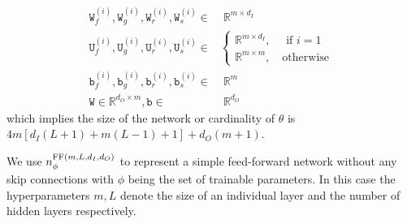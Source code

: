 \begin{align}
   \mathtt W_f^{(i)}, 
   \mathtt W_g^{(i)},  \mathtt W_r^{(i)},  \mathtt W_s^{(i)} \in&\;
   \mathbb R^{m\times d_I}\\
   \mathtt U_f^{(i)},
\mathtt U_g^{(i)},
\mathtt U_r^{(i)},
\mathtt U_s^{(i)}\in&
   \begin{cases}\mathbb R^{m\times d_I},\quad\text{ if }i=1 \\
   \mathbb R^{m\times m},\quad\text{otherwise}
   \end{cases}\\
   \mathtt b_f^{(i)},\mathtt b_g^{(i)},\mathtt b_r^{(i)},\mathtt b_s^{(i)}\in&\;\mathbb R^m\\
   \mathtt W\in\mathbb R^{d_O\times m}, \mathtt b\in&\;\mathbb R^{d_O}
\end{align}
which implies the size of the network or cardinality of $\theta$ is $4m[d_I(L+1)+m(L-1)+1]+d_O(m+1)$.

We use $n^{{\rm FF}(m, L, d_I, d_O)}_\phi$ to represent a simple feed-forward network without any skip connections with $\phi$ being the set of trainable parameters. In this case the hyperparameters $m, L$ denote the size of an individual layer and the number of hidden layers respectively. 

